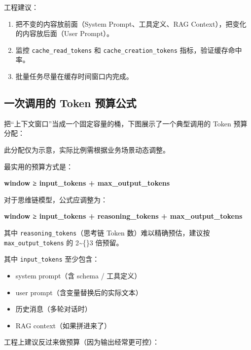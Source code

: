 \documentclass[10pt,a4paper]{ctexart}
\begin{document}
工程建议：


\begin{enumerate}[itemsep=2pt, topsep=4pt]
  \item 把不变的内容放前面（System Prompt、工具定义、RAG Context），把变化的内容放后面（User Prompt）。
  \item 监控 \texttt{cache\_read\_tokens} 和 \texttt{cache\_creation\_tokens} 指标，验证缓存命中率。
  \item 批量任务尽量在缓存时间窗口内完成。
\end{enumerate}


\subsection{一次调用的 Token 预算公式}


把“上下文窗口”当成一个固定容量的桶，下图展示了一个典型调用的 Token 预算分配：



此分配仅为示意，实际比例需根据业务场景动态调整。



最实用的预算方式是：



\textbf{window ≥ input\_tokens + max\_output\_tokens}



对于思维链模型，公式应调整为：



\textbf{window ≥ input\_tokens + reasoning\_tokens + max\_output\_tokens}



其中 \texttt{reasoning\_tokens}（思考链 Token 数）难以精确预估，建议按 \texttt{max\_output\_tokens} 的 2\textasciitilde\{\}3 倍预留。



其中 \texttt{input\_tokens} 至少包含：


\begin{itemize}[itemsep=2pt, topsep=4pt]
  \item system prompt（含 schema / 工具定义）
  \item user prompt（含变量替换后的实际文本）
  \item 历史消息（多轮对话时）
  \item RAG context（如果拼进来了）
\end{itemize}


工程上建议反过来做预算（因为输出经常更可控）：
\end{document}
